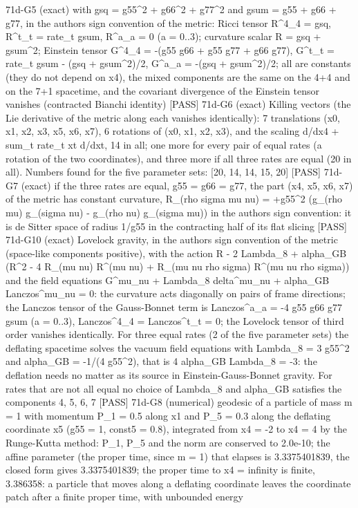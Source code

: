 \documentclass[
  10pt,
]{article}
\newenvironment{Shaded}{}{}
\newcommand{\NormalTok}[1]{#1}
\begin{document}
\begin{Shaded}
\begin{Highlighting}[]
\NormalTok{[PASS] 71d{-}G5  (exact) with gsq = g55\^{}2 + g66\^{}2 + g77\^{}2 and gsum = g55 + g66 + g77, in the author\textquotesingle{}s sign convention of the metric: Ricci tensor R\^{}4\_4 = gsq, R\^{}t\_t = rate\_t gsum, R\^{}a\_a = 0 (a = 0..3); curvature scalar R = gsq + gsum\^{}2; Einstein tensor G\^{}4\_4 = {-}(g55 g66 + g55 g77 + g66 g77), G\^{}t\_t = rate\_t gsum {-} (gsq + gsum\^{}2)/2, G\^{}a\_a = {-}(gsq + gsum\^{}2)/2; all are constants (they do not depend on x4), the mixed components are the same on the 4+4 and on the 7+1 spacetime, and the covariant divergence of the Einstein tensor vanishes (contracted Bianchi identity)}
\NormalTok{[PASS] 71d{-}G6  (exact) Killing vectors (the Lie derivative of the metric along each vanishes identically): 7 translations (x0, x1, x2, x3, x5, x6, x7), 6 rotations of (x0, x1, x2, x3), and the scaling d/dx4 + sum\_t rate\_t xt d/dxt, 14 in all; one more for every pair of equal rates (a rotation of the two coordinates), and three more if all three rates are equal (20 in all). Numbers found for the five parameter sets: [20, 14, 14, 15, 20]}
\NormalTok{[PASS] 71d{-}G7  (exact) if the three rates are equal, g55 = g66 = g77, the part (x4, x5, x6, x7) of the metric has constant curvature, R\_(rho sigma mu nu) = +g55\^{}2 (g\_(rho mu) g\_(sigma nu) {-} g\_(rho nu) g\_(sigma mu)) in the author\textquotesingle{}s sign convention: it is de Sitter space of radius 1/g55 in the contracting half of its flat slicing}
\NormalTok{[PASS] 71d{-}G10  (exact) Lovelock gravity, in the author\textquotesingle{}s sign convention of the metric (space{-}like components positive), with the action R {-} 2 Lambda\_8 + alpha\_GB (R\^{}2 {-} 4 R\_(mu nu) R\^{}(mu nu) + R\_(mu nu rho sigma) R\^{}(mu nu rho sigma)) and the field equations G\^{}mu\_nu + Lambda\_8 delta\^{}mu\_nu + alpha\_GB Lanczos\^{}mu\_nu = 0: the curvature acts diagonally on pairs of frame directions; the Lanczos tensor of the Gauss{-}Bonnet term is Lanczos\^{}a\_a = {-}4 g55 g66 g77 gsum (a = 0..3), Lanczos\^{}4\_4 = Lanczos\^{}t\_t = 0; the Lovelock tensor of third order vanishes identically. For three equal rates (2 of the five parameter sets) the deflating spacetime solves the vacuum field equations with Lambda\_8 = 3 g55\^{}2 and alpha\_GB = {-}1/(4 g55\^{}2), that is 4 alpha\_GB Lambda\_8 = {-}3: the deflation needs no matter as its source in Einstein{-}Gauss{-}Bonnet gravity. For rates that are not all equal no choice of Lambda\_8 and alpha\_GB satisfies the components 4, 5, 6, 7}
\NormalTok{[PASS] 71d{-}G8  (numerical) geodesic of a particle of mass m = 1 with momentum P\_1 = 0.5 along x1 and P\_5 = 0.3 along the deflating coordinate x5 (g55 = 1, const5 = 0.8), integrated from x4 = {-}2 to x4 = 4 by the Runge{-}Kutta method: P\_1, P\_5 and the norm are conserved to 2.0e{-}10; the affine parameter (the proper time, since m = 1) that elapses is 3.3375401839, the closed form gives 3.3375401839; the proper time to x4 = infinity is finite, 3.386358: a particle that moves along a deflating coordinate leaves the coordinate patch after a finite proper time, with unbounded energy}

\end{Highlighting}
\end{Shaded}
\end{document}
